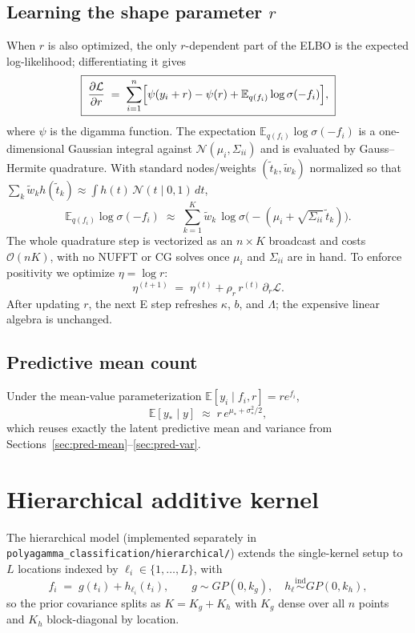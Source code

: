 \documentclass{article}
\newcommand{\E}{\mathbb{E}}
\newcommand{\calO}{\mathcal{O}}
\begin{document}
\subsection{Learning the shape parameter $r$}

When $r$ is also optimized, the only $r$-dependent part of the ELBO is the expected log-likelihood; differentiating it gives
\begin{equation}
\boxed{\;
  \frac{\partial\mathcal{L}}{\partial r}
  \;=\;
  \sum_{i=1}^{n}\Bigl[
    \psi(y_i+r) - \psi(r) + \E_{q(f_i)}\log\sigma(-f_i)
  \Bigr],
\;}
\end{equation}
where $\psi$ is the digamma function. The expectation $\E_{q(f_i)}\log\sigma(-f_i)$ is a one-dimensional Gaussian integral against $\mathcal{N}(\mu_i,\Sigma_{ii})$ and is evaluated by Gauss--Hermite quadrature. With standard nodes/weights $(\tilde t_k,\tilde w_k)$ normalized so that $\sum_k\tilde w_k h(\tilde t_k)\approx\int h(t)\,\mathcal{N}(t\mid 0,1)\,dt$,
\[
  \E_{q(f_i)}\log\sigma(-f_i)
  \;\approx\;
  \sum_{k=1}^{K}\tilde w_k\,
  \log\sigma\!\bigl(-(\mu_i+\sqrt{\Sigma_{ii}}\,\tilde t_k)\bigr).
\]
The whole quadrature step is vectorized as an $n\times K$ broadcast and costs $\calO(nK)$, with no NUFFT or CG solves once $\mu_i$ and $\Sigma_{ii}$ are in hand. To enforce positivity we optimize $\eta=\log r$:
\[
  \eta^{(t+1)} \;=\; \eta^{(t)} + \rho_r\,r^{(t)}\,\partial_r\mathcal{L}.
\]
After updating $r$, the next E step refreshes $\kappa$, $b$, and $\Lambda$; the expensive linear algebra is unchanged.

\subsection{Predictive mean count}
Under the mean-value parameterization $\E[y_i\mid f_i,r]=re^{f_i}$,
\[
  \E[y_{*}\mid y] \;\approx\; r\,e^{\mu_{*}+\sigma_{*}^{2}/2},
\]
which reuses exactly the latent predictive mean and variance from Sections~\ref{sec:pred-mean}--\ref{sec:pred-var}.

\section{Hierarchical additive kernel}
\label{sec:hier}

The hierarchical model (implemented separately in \texttt{polyagamma\_classification/hierarchical/}) extends the single-kernel setup to $L$ locations indexed by $\ell_i\in\{1,\ldots,L\}$, with
\[
  f_i \;=\; g(t_i) + h_{\ell_i}(t_i),
  \qquad g\sim GP(0,k_g),
  \quad h_\ell\stackrel{\text{ind}}{\sim}GP(0,k_h),
\]
so the prior covariance splits as $K=K_g+K_h$ with $K_g$ dense over all $n$ points and $K_h$ block-diagonal by location.
\end{document}

